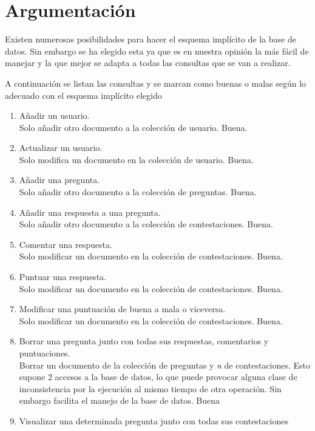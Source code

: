 \documentclass{article}
\begin{document}
  \section{Argumentación}
    Existen numerosas posibilidades para hacer el esquema implícito de la base de datos.
    Sin embargo se ha elegido esta ya que es en nuestra opinión la más fácil de manejar y
    la que mejor se adapta a todas las consultas que se van a realizar.
    \par
    A continuación se listan las consultas y se marcan como buenas o malas según lo adecuado
    con el esquema implícito elegido
    \par
    \begin{enumerate}
      \item Añadir un usuario. \\
      Solo añadir otro documento a la colección de usuario. Buena.
      \item Actualizar un usuario. \\
      Solo modifica un documento en la colección de usuario. Buena.
      \item Añadir una pregunta. \\
      Solo añadir otro documento a la colección de preguntas. Buena.      
      \item Añadir una respuesta a una pregunta. \\
      Solo añadir otro documento a la colección de contestaciones. Buena.
      \item Comentar una respuesta. \\
      Solo modificar un documento en la colección de contestaciones. Buena.
      \item Puntuar una respuesta. \\
      Solo modificar un documento en la colección de contestaciones. Buena.
      \item Modificar una puntuación de buena a mala o viceversa. \\
      Solo modificar un documento en la colección de contestaciones. Buena.
      \item Borrar una pregunta junto con todas sus respuestas, comentarios y puntuaciones. \\
      Borrar un documento de la colección de preguntas y \emph{n} de contestaciones.
      Esto supone 2 accesos a la base de datos, lo que puede provocar alguna clase de inconsistencia
      por la ejecución al mismo tiempo de otra operación. Sin embargo facilita el manejo de
      la base de datos. Buena
      \item Visualizar una determinada pregunta junto con todas sus contestaciones

\end{enumerate}
\end{document}
